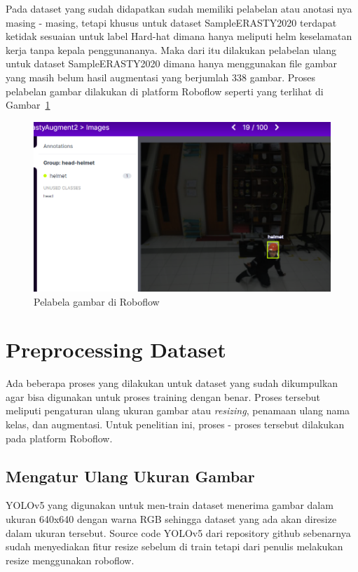 Pada dataset yang sudah didapatkan sudah memiliki pelabelan atau anotasi nya masing - masing, 
tetapi khusus untuk dataset SampleERASTY2020 terdapat ketidak sesuaian untuk label Hard-hat  
dimana hanya meliputi helm keselamatan kerja tanpa kepala penggunananya. Maka dari itu  dilakukan 
pelabelan ulang untuk dataset SampleERASTY2020 dimana hanya menggunakan file gambar yang masih 
belum hasil augmentasi yang berjumlah 338 gambar. Proses pelabelan gambar dilakukan di platform Roboflow
seperti yang terlihat di Gambar~\ref{fig:gambarbesertalabel}

\begin{figure}[ht]
  \centering
  \includegraphics[width=1\textwidth]{gambar/labeldiroboflow.png}
  \caption{Pelabela gambar di Roboflow}
  \label{fig:gambarbesertalabel}  
\end{figure}

\section{Preprocessing Dataset}
\label{sec:preprocessing}
\par Ada beberapa proses yang dilakukan untuk dataset yang sudah dikumpulkan agar bisa digunakan untuk proses
training dengan benar. Proses tersebut meliputi pengaturan ulang ukuran gambar atau \emph{resizing}, penamaan ulang nama kelas, dan augmentasi.
Untuk penelitian ini, proses - proses tersebut dilakukan pada platform Roboflow.


\subsection{Mengatur Ulang Ukuran Gambar}
\par YOLOv5 yang digunakan untuk men-train dataset menerima gambar dalam ukuran 640x640 dengan 
warna RGB sehingga dataset yang ada akan diresize dalam ukuran tersebut. 
Source code YOLOv5 dari repository github sebenarnya sudah menyediakan fitur 
resize sebelum di train tetapi dari penulis melakukan resize menggunakan roboflow. 

